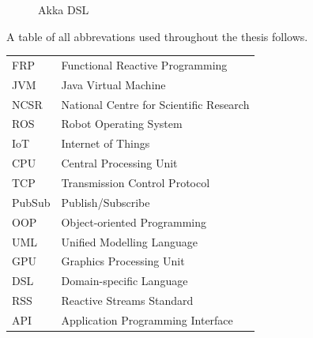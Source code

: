 \documentclass{dithesis}
\begin{document}

	\begin{figure}[h!] 
		\begin{minipage}[c]{0.5\linewidth} 
			 
		\end{minipage}
		\hfill
		\begin{minipage}[c]{0.5\linewidth} 
			\inputminted{scala}{code/akka.scala}	
		\end{minipage}		
		\caption{Akka DSL}
	\end{figure}	








\begin{thesisabbreviations}
A table of all abbrevations used throughout the thesis follows.

\begin{tabularx}{\textwidth}{|X|X|}
  \hline
  FRP & Functional Reactive Programming \\
  JVM & Java Virtual Machine \\
  NCSR & National Centre for Scientific Research \\
  ROS & Robot Operating System \\
  IoT & Internet of Things \\
  CPU & Central Processing Unit \\
  TCP & Transmission Control Protocol \\
  PubSub & Publish/Subscribe \\
  OOP & Object-oriented Programming \\
  UML & Unified Modelling Language \\
  GPU & Graphics Processing Unit \\
  DSL & Domain-specific Language \\
  RSS & Reactive Streams Standard \\
  API & Application Programming Interface \\
  \hline
\end{tabularx}

\end{thesisabbreviations}

\newpage

{}
\end{document}
